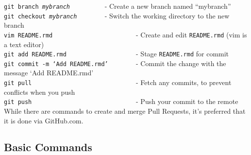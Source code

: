 \documentclass{article}
\begin{document}
\noindent
\texttt{git branch \textit{mybranch}}\verb+          +- Create a new branch named ``mybranch''\\
\texttt{git checkout \textit{mybranch}}\verb+        +- Switch the working directory to the new branch\\
\texttt{vim README.rmd}\verb+                        +- Create and edit \texttt{README.rmd} (vim is a text editor)\\
\texttt{git add README.rmd}\verb+                    +- Stage \texttt{README.rmd} for commit\\
\texttt{git commit -m `Add README.rmd'}\verb+        +- Commit the change with the message `Add README.rmd'\\
\texttt{git pull}\verb+                              +- Fetch any commits, to prevent conflicts when you push\\
\texttt{git push}\verb+                              +- Push your commit to the remote\\

\noindent
While there are commands to create and merge Pull Requests, it's preferred that it is done via GitHub.com.

\pagebreak

\subsection{Basic Commands}
\end{document}
